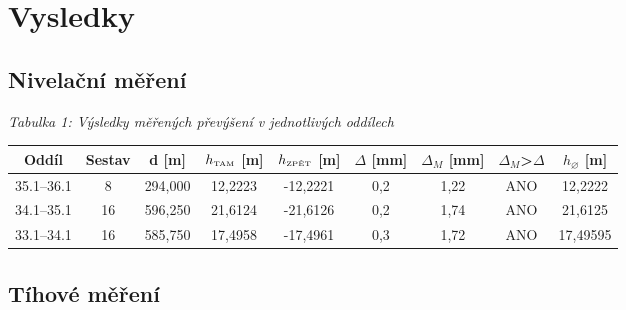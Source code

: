 \section{Vysledky}

\subsection{Nivelační měření}

\begin{table}[H]
    \centering
    \textit{Tabulka 1: Výsledky měřených převýšení v jednotlivých oddílech}
    
    \begin{tabular}{|c|c|c|c|c|c|c|c|c|}
        \hline
        \textbf{Oddíl} & \textbf{Sestav} & d [m] & $h_{\text{\tiny{TAM}}}$ [m] & $h_{\text{\tiny{ZPĚT}}}$ [m] & $\Delta$ [mm] & $\Delta_M$ [mm] & $\Delta_M$>$\Delta$ & $h_{\diameter}$ [m] \\
        \hline \hline
        35.1–36.1 & 8  & 294,000 & 12,2223 & -12,2221 & 0,2 & 1,22 & ANO & 12,2222\\ \hline
        34.1–35.1 & 16 & 596,250 & 21,6124 & -21,6126 & 0,2 & 1,74 & ANO & 21,6125\\ \hline 
        33.1–34.1 & 16 & 585,750 & 17,4958 & -17,4961 & 0,3 & 1,72 & ANO & 17,49595\\ \hline
    \end{tabular}
\end{table}


\subsection{Tíhové měření}